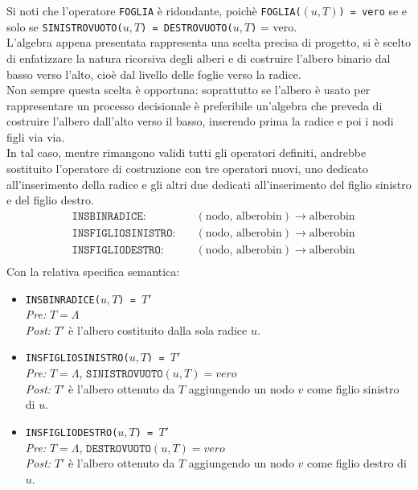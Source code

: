 \documentclass[12pt]{report}
\begin{document}
  	Si noti che l'operatore \texttt{FOGLIA} è ridondante, poichè \texttt{FOGLIA($(u, T)$) = vero} se e solo se \texttt{SINISTROVUOTO($u, T$) = DESTROVUOTO($u, T$)} = vero. \\
  	L'algebra appena presentata rappresenta una scelta precisa di progetto, si è scelto di enfatizzare la natura ricorsiva degli alberi e di costruire l'albero binario dal basso verso l'alto, cioè dal livello delle foglie verso la radice. \\
  	Non sempre questa scelta è opportuna: soprattutto se l'albero è usato per rappresentare un processo decisionale è preferibile un'algebra che preveda di costruire l'albero dall'alto verso il basso, inserendo prima la radice e poi i nodi figli via via. \\
  	In tal caso, mentre rimangono validi tutti gli operatori definiti, andrebbe sostituito l'operatore di costruzione con tre operatori nuovi, uno dedicato all'inserimento della radice e gli altri due dedicati all'inserimento del figlio sinistro e del figlio destro.
  	\begin{align*}
  		&\texttt{INSBINRADICE}: &\quad (\text{nodo, alberobin}) \to \text{alberobin} \\
  		&\texttt{INSFIGLIOSINISTRO}: &\quad (\text{nodo, alberobin}) \to \text{alberobin} \\
  		&\texttt{INSFIGLIODESTRO}: &\quad (\text{nodo, alberobin}) \to \text{alberobin} \\
  	\end{align*}
  	Con la relativa specifica semantica:
  	\begin{itemize}
  		\item \texttt{INSBINRADICE($u, T$) = $T'$} \\
  		\quad \textit{Pre:} $T = \Lambda$ \\
  		\quad \textit{Post:} $T'$ è l'albero costituito dalla sola radice $u$.

  		\item \texttt{INSFIGLIOSINISTRO($u, T$) = $T'$} \\
  		\quad \textit{Pre:} $T = \Lambda$, $\texttt{SINISTROVUOTO}(u, T) = vero$\\
  		\quad \textit{Post:} $T'$ è l'albero ottenuto da $T$ aggiungendo un nodo $v$ come figlio sinistro di $u$.

  		\item \texttt{INSFIGLIODESTRO($u, T$) = $T'$} \\
  		\quad \textit{Pre:} $T = \Lambda$, $\texttt{DESTROVUOTO}(u, T) = vero$ \\
  		\quad \textit{Post:} $T'$ è l'albero ottenuto da $T$ aggiungendo un nodo $v$ come figlio destro di $u$.
  	\end{itemize}
\end{document}
